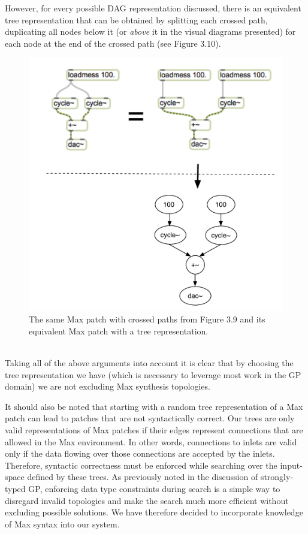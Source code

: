 \documentclass[a4paper,12pt]{report} 	%
\numberwithin{figure}{chapter}
\numberwithin{table}{chapter}
\numberwithin{equation}{chapter}
\begin{document}
\begin{flushleft}
However, for every possible DAG representation discussed, there is an equivalent tree representation that can be obtained by splitting each crossed path, duplicating all nodes below it (or \emph{above} it in the visual diagrams presented) for each node at the end of the crossed path (see Figure 3.10).
\begin{figure}[h!]
\begin{center}
\includegraphics[scale=0.8]{MaxDAGsCrossedPaths2}
\caption[Uncrossing Paths to Form a Tree]{The same Max patch with crossed paths from Figure 3.9 and its equivalent Max patch with a tree representation.}
\end{center}
\end{figure}
\\
Taking all of the above arguments into account it is clear that by choosing the tree representation we have (which is necessary to leverage most work in the GP domain) we are not excluding Max synthesis topologies. 

It should also be noted that starting with a random tree representation of a Max patch can lead to patches that are not syntactically correct. Our trees are only valid representations of Max patches if their edges represent connections that are allowed in the Max environment. In other words, connections to inlets are valid only if the data flowing over those connections are accepted by the inlets. Therefore, syntactic correctness must be enforced while searching over the input-space defined by these trees. As previously noted in the discussion of strongly-typed GP, enforcing data type constraints during search is a simple way to disregard invalid topologies and make the search much more efficient without excluding possible solutions. We have therefore decided to incorporate knowledge of Max syntax into our system.


\end{flushleft}
\end{document}
